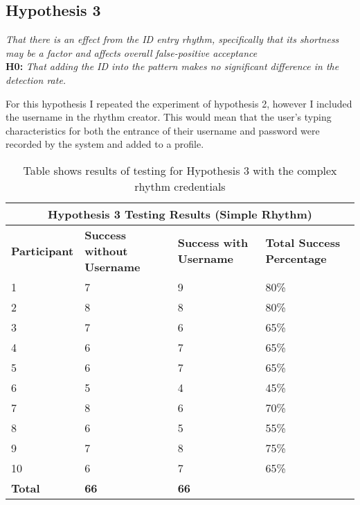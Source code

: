 \documentclass{article}
\begin{document}
\subsection{Hypothesis 3}
\begin{center}
\textit{That there is an effect from the ID entry rhythm, specifically that its shortness may be a factor and affects overall false-positive acceptance} \newline \\

\textbf{H0:} \textit{That adding the ID	into the	pattern makes no significant	difference in the detection	rate.} \newline \\
\end{center}

For this hypothesis I repeated the experiment of hypothesis 2, however I included the username in the rhythm creator. This would mean that the user's typing characteristics for both the entrance of their username and password were recorded by the system and added to a profile.  

{
\begin{table} [H]
\centering
\begin{tabular}{ |p{2cm}|p{4cm}|p{4cm}| p{4cm} | }
\hline
\multicolumn{4}{|c|}{\textbf{Hypothesis 3 Testing Results (Simple Rhythm)}} \\
\hline
\textbf{Participant} & \textbf{Success without Username} & \textbf{Success with Username} & \textbf{Total Success Percentage} \\
\hline
1 & 7 & 9 & 80\% \\
\hline
2 & 8 & 8 & 80\% \\
\hline
3 & 7 & 6 & 65\% \\
\hline
4 & 6 & 7 & 65\%  \\
\hline
5 & 6 & 7 & 65\% \\
\hline
6 & 5 & 4 & 45\% \\
\hline
7 & 8 & 6 & 70\% \\
\hline
8 & 6 & 5 & 55\% \\
\hline
9 & 7 & 8 & 75\% \\
\hline
10 & 6 & 7 & 65\% \\
\hline
\textbf{Total} & \textbf{66} & \textbf{66} & \\
\hline
\end{tabular}
\caption{Table shows results of testing for Hypothesis 3 with the complex rhythm credentials}
\label{table:3}
\end{table}
}
\end{document}
